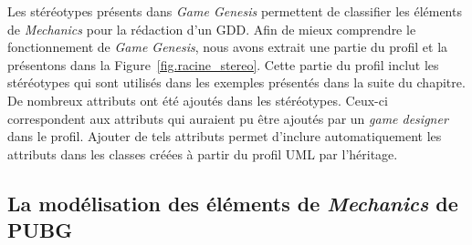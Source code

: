 Les stéréotypes présents dans \emph{Game Genesis} permettent de classifier les \'el\'ements de \emph{Mechanics} pour la rédaction d'un GDD.
Afin de mieux comprendre le fonctionnement de \emph{Game Genesis}, nous avons extrait une partie du profil et la pr\'esentons dans la Figure~\ref{fig.racine_stereo}.
Cette partie du profil inclut les stéréotypes qui sont utilisés dans les exemples présentés dans la suite du chapitre.
De nombreux attributs ont été ajoutés dans les stéréotypes.
Ceux-ci correspondent aux attributs qui auraient pu être ajoutés par un \emph{game designer} dans le profil.
Ajouter de tels attributs permet d'inclure automatiquement les attributs dans les classes créées à partir du profil UML par l'héritage.


\subsection{La modélisation des \'el\'ements de \emph{Mechanics} de PUBG}

